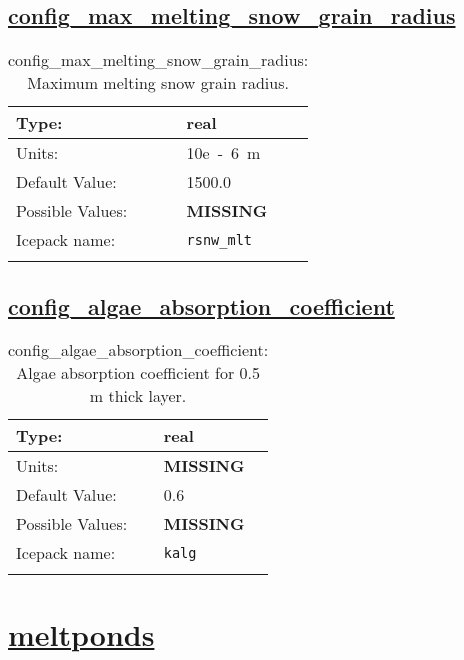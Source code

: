 \subsection[config\_max\_melting\_snow\_grain\_radius]{\hyperref[sec:nm_tab_shortwave]{config\_max\_melting\_snow\_grain\_radius}}
\label{subsec:nm_sec_config_max_melting_snow_grain_radius}
\begin{center}
\begin{longtable}{| p{2.0in} || p{4.0in} |}
    \hline
    Type: & real \\
    \hline
    Units: & \si{10e-6.m} \\
    \hline
    Default Value: & 1500.0 \\
    \hline
    Possible Values: & {\bf \color{red} MISSING} \\
    \hline
    \hline
    Icepack name: & \verb+rsnw_mlt+ \\
    \caption{config\_max\_melting\_snow\_grain\_radius: Maximum melting snow grain radius.}
\end{longtable}
\end{center}
\subsection[config\_algae\_absorption\_coefficient]{\hyperref[sec:nm_tab_shortwave]{config\_algae\_absorption\_coefficient}}
\label{subsec:nm_sec_config_algae_absorption_coefficient}
\begin{center}
\begin{longtable}{| p{2.0in} || p{4.0in} |}
    \hline
    Type: & real \\
    \hline
    Units: & {\bf \color{red} MISSING} \\
    \hline
    Default Value: & 0.6 \\
    \hline
    Possible Values: & {\bf \color{red} MISSING} \\
    \hline
    \hline
    Icepack name: & \verb+kalg+ \\
    \caption{config\_algae\_absorption\_coefficient: Algae absorption coefficient for 0.5 m thick layer.}
\end{longtable}
\end{center}
\section[meltponds]{\hyperref[sec:nm_tab_meltponds]{meltponds}}
\label{sec:nm_sec_meltponds}
